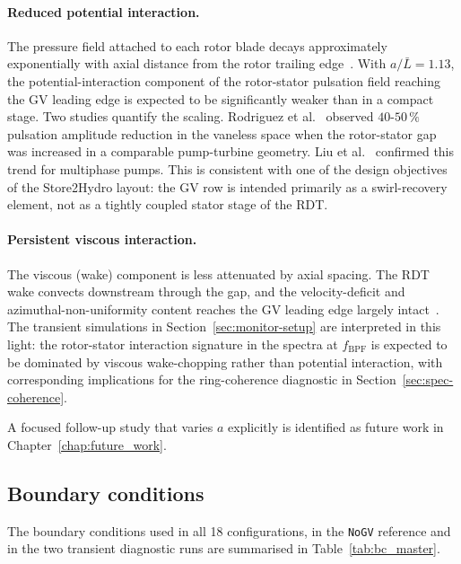 \paragraph{Reduced potential interaction.}
The pressure field attached to each rotor blade decays approximately exponentially with axial distance from the rotor trailing edge~\cite{Korakianitis1989,Hodson1989}. With $a/\bar{L} = 1.13$, the potential-interaction component of the rotor-stator pulsation field reaching the GV leading edge is expected to be significantly weaker than in a compact stage. Two studies quantify the scaling. Rodriguez et al.~\cite{Rodriguez2007} observed $40$-$50\,\%$ pulsation amplitude reduction in the vaneless space when the rotor-stator gap was increased in a comparable pump-turbine geometry. Liu et al.~\cite{Liu2022GapMatching} confirmed this trend for multiphase pumps. This is consistent with one of the design objectives of the Store2Hydro layout: the GV row is intended primarily as a swirl-recovery element, not as a tightly coupled stator stage of the RDT.

\paragraph{Persistent viscous interaction.}
The viscous (wake) component is less attenuated by axial spacing. The RDT wake convects downstream through the gap, and the velocity-deficit and azimuthal-non-uniformity content reaches the GV leading edge largely intact~\cite{Korakianitis1989,Duan2019}. The transient simulations in Section~\ref{sec:monitor-setup} are interpreted in this light: the rotor-stator interaction signature in the spectra at $f_{\mathrm{BPF}}$ is expected to be dominated by viscous wake-chopping rather than potential interaction, with corresponding implications for the ring-coherence diagnostic in Section~\ref{sec:spec-coherence}.

A focused follow-up study that varies $a$ explicitly is identified as future work in Chapter~\ref{chap:future_work}.

\subsection{Boundary conditions}
\label{sec:methods_bc}
 
The boundary conditions used in all 18 configurations, in the \texttt{NoGV} reference and in the two transient diagnostic runs are summarised in Table~\ref{tab:bc_master}.
 
